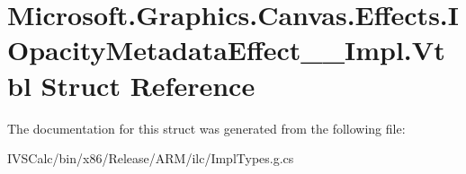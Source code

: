 \hypertarget{struct_microsoft_1_1_graphics_1_1_canvas_1_1_effects_1_1_i_opacity_metadata_effect_____impl_1_1_vtbl}{}\section{Microsoft.\+Graphics.\+Canvas.\+Effects.\+I\+Opacity\+Metadata\+Effect\+\_\+\+\_\+\+Impl.\+Vtbl Struct Reference}
\label{struct_microsoft_1_1_graphics_1_1_canvas_1_1_effects_1_1_i_opacity_metadata_effect_____impl_1_1_vtbl}


The documentation for this struct was generated from the following file\+:\begin{DoxyCompactItemize}
\item 
I\+V\+S\+Calc/bin/x86/\+Release/\+A\+R\+M/ilc/Impl\+Types.\+g.\+cs\end{DoxyCompactItemize}
